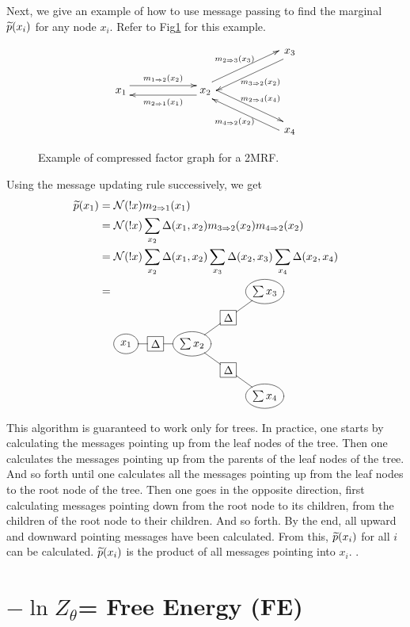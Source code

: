 Next, we give an
example
of how to use message
passing
to find
the marginal ${\widetilde{p}}(x_i)$
for any node $x_i$. Refer to
Fig\ref{fig-mp-3node-example}
for this example.

\begin{figure}[h!]
$$\xymatrix@C=5pc{
&&x_3\ar@<1ex>[ld]^{m_{3\rdart 2}(x_2)}
\\
x_1\ar@<1ex>[r]^{m_{1\rdart 2}(x_2)}
&x_2\ar@<1ex>[l]^{m_{2\rdart 1}(x_1)}
\ar@<1ex>[ru]^{m_{2\rdart 3}(x_3)}
\ar@<1ex>[rd]^{m_{2\rdart 4}(x_4)}
\\
&&x_4\ar@<1ex>[lu]^{m_{4\rdart 2}(x_2)}
}$$
\caption{
Example of compressed factor graph
for a 2MRF.}
\label{fig-mp-3node-example}
\end{figure}

Using the message
updating rule
successively, we get
\begin{align}
\tP(x_1)
&=
\caln(!x)m_{2\rdart 1}(x_1)
\\
&=
\caln(!x)
\sum_{x_2}
\Delta(x_1,x_2)
m_{3\rdart 2}(x_2)
m_{4\rdart 2}(x_2)
\\
&=
\caln(!x)
\sum_{x_2}
\Delta(x_1,x_2)
\sum_{x_3}
\Delta(x_2,x_3)
\sum_{x_4}
\Delta(x_2, x_4)
\\
&=
\xymatrix@R=.5pc@C=.7pc{
&&&&
*++[o][F]{\sum x_3}
\\
&&&
*+[F]{\Delta}\ar@{-}[ru]
\\
*++[o][F]{x_1}\ar@{-}[r]
&*+[F]{\Delta}\ar@{-}[r]
&*++[o][F]{\sum x_2}
\ar@{-}[ru]\ar@{-}[rd]
\\
&&&*+[F]{\Delta}\ar@{-}[rd]
\\
&&&&
*++[o][F]{\sum x_4}
}
\end{align}

This
algorithm
is guaranteed to work
only for trees. In practice,
one starts by calculating the
messages pointing up from
the leaf nodes
of the tree. Then one calculates
the messages pointing up from the parents
of the leaf nodes of the tree.
And so forth until
one calculates
all the messages
pointing up from the leaf nodes
to the root node
of the tree.
Then one goes in the opposite
direction, first calculating
messages pointing down from the
root node to its children, from the
children  of the root node
to their children. And so forth.
By the end,
all upward and downward
pointing
messages have been calculated.
From this, ${\widetilde{p}}(x_i)$
for all $i$ can be calculated.
${\widetilde{p}}(x_i)$
is the product of all
messages pointing into $x_i$.
.


\section{ $-\ln Z_\theta$=
Free Energy (FE)}

